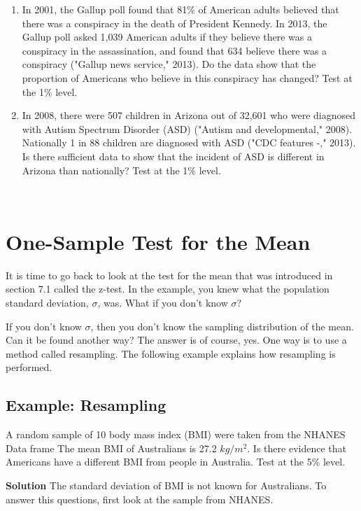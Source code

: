 \documentclass[]{book}
\begin{document}
\begin{enumerate}
\item
  In 2001, the Gallup poll found that 81\% of American adults believed that there was a conspiracy in the death of President Kennedy. In 2013, the Gallup poll asked 1,039 American adults if they believe there was a conspiracy in the assassination, and found that 634 believe there was a conspiracy ("Gallup news service," 2013). Do the data show that the proportion of Americans who believe in this conspiracy has changed? Test at the 1\% level.
\item
  In 2008, there were 507 children in Arizona out of 32,601 who were diagnosed with Autism Spectrum Disorder (ASD) ("Autism and developmental," 2008). Nationally 1 in 88 children are diagnosed with ASD ("CDC features -," 2013). Is there sufficient data to show that the incident of ASD is different in Arizona than nationally? Test at the 1\% level.
\end{enumerate}

\textbf{\\
}

\hypertarget{one-sample-test-for-the-mean}{%
\section{One-Sample Test for the Mean}\label{one-sample-test-for-the-mean}}

It is time to go back to look at the test for the mean that was introduced in section 7.1 called the z-test. In the example, you knew what the population standard deviation, \(\sigma\), was. What if you don't know \(\sigma\)?

If you don't know \(\sigma\), then you don't know the sampling distribution of the mean. Can it be found another way? The answer is of course, yes. One way is to use a method called resampling. The following example explains how resampling is performed.

\hypertarget{example-resampling}{%
\subsection{Example: Resampling}\label{example-resampling}}

A random sample of 10 body mass index (BMI) were taken from the NHANES Data frame The mean BMI of Australians is 27.2 \(kg/m^2\). Is there evidence that Americans have a different BMI from people in Australia. Test at the 5\% level.

\textbf{Solution}
The standard deviation of BMI is not known for Australians. To answer this questions, first look at the sample from NHANES.
\end{document}
